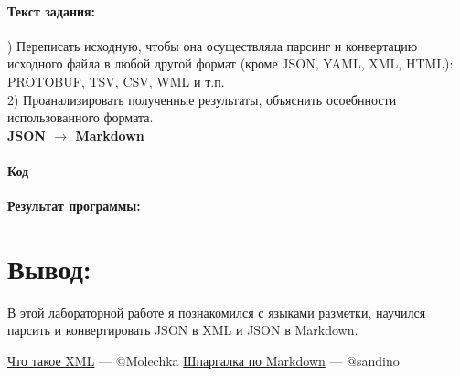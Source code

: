 \documentclass[12pt,onecolumn]{article}
\begin{document}
\begin{flushleft}
\paragraph{Текст задания:}
\hfill {}) Переписать исходную, чтобы она осуществляла парсинг и конвертацию исходного файла в любой другой формат (кроме JSON, YAML, XML, HTML): PROTOBUF, TSV, CSV, WML и т.п.\\
2) Проанализировать полученные результаты, объяснить осоебнности использованного формата.\\
\textbf{JSON $\rightarrow$ Markdown}
\paragraph{Код}
\hfill \break
\FloatBarrier

\hfill \break
\textbf{Результат программы:}\\

\section{Вывод:}
В этой лабораторной работе я познакомился с языками разметки, научился парсить и конвертировать JSON в XML и JSON в Markdown.
\end{flushleft}
\begin{thebibliography}{2}
\href{https://habr.com/ru/post/524288/}{Что такое XML} --- @Molechka
\href{https://github.com/sandino/Markdown-Cheatsheet#headers}{Шпаргалка по Markdown} --- @sandino
\end{thebibliography}
\end{document}
